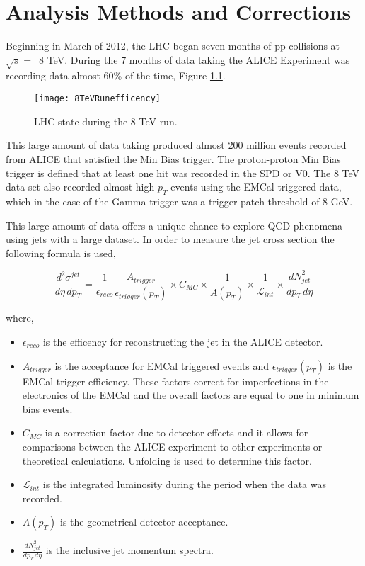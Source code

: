 \chapter{Analysis Methods and Corrections} \label{ch:analysis}

Beginning in March of 2012, the LHC began seven months of pp collisions at $\sqrt{s} = \,$ 8 TeV. During the 7 months of data taking the ALICE Experiment was recording data almost 60\% of the time, Figure \ref{fig:RunEff}.

\begin{figure}[h]
\texttt{[image: 8TeVRunefficency]}
\centering
\caption{LHC state during the 8 TeV run. }
\label{fig:RunEff}
\end{figure}

\noindent
This large amount of data taking produced almost 200 million events recorded from ALICE that satisfied the Min Bias trigger.  The proton-proton Min Bias trigger is defined that at least one hit was recorded in the SPD or V0.  The 8 TeV data set also recorded almost high-$p_{T}$ events using the EMCal triggered data, which in the case of the Gamma trigger was a trigger patch threshold of 8 GeV.  

This large amount of data offers a unique chance to explore QCD phenomena using jets with a large dataset.   In order to measure the jet cross section the following formula is used,

\begin{equation}
	\frac{d^{2} \sigma^{jet}}{d\eta \, dp_{T}} = \frac{1}{\epsilon_{reco}} \frac{A_{trigger}}{\epsilon_{trigger}(p_{T})} \times C_{MC} \times \frac{1}{A(p_{T}) } \times \frac{1}{\mathscr{L}_{int}} \times \frac{dN^{2}_{jet}}{dp_{T} \, d\eta}
\label{eq:xsecdef}
\end{equation}

\noindent
where,

\begin{itemize}
  \item $\epsilon_{reco}$ is the efficency for reconstructing the jet in the ALICE detector.
  \item $A_{trigger}$ is the acceptance for EMCal triggered events and $\epsilon_{trigger}(p_{T})$ is the EMCal trigger efficiency.  These factors correct for imperfections in the electronics of the EMCal and the overall factors are equal to one in minimum bias events.
  \item $C_{MC}$ is a correction factor due to detector effects and it allows for comparisons between the ALICE experiment to other experiments or theoretical calculations.  Unfolding is used to determine this factor.
  \item $\mathscr{L}_{int}$ is the integrated luminosity during the period when the data was recorded.
  \item $A(p_{T})$ is the geometrical detector acceptance.
  \item $\frac{dN^{2}_{jet}}{dp_{T} \, d\eta}$ is the inclusive jet momentum spectra.
  
\end{itemize}

